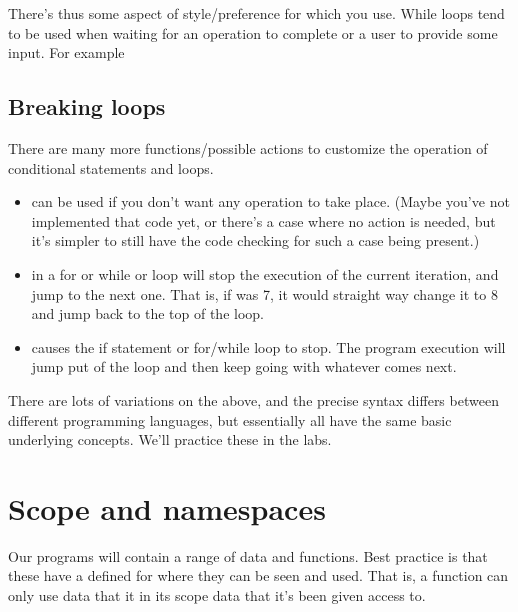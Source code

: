 \documentclass[letterpaper,10pt,british]{sphinxmanual}
\begin{document}
\sphinxAtStartPar
There’s thus some aspect of style/preference for which you use. While loops tend to be used when waiting for an operation to complete or a user to provide some input. For example

\begin{sphinxVerbatim}[commandchars=\\\{\}]
 
\end{sphinxVerbatim}


\subsection{Breaking loops}
\label{\detokenize{chapters/programming_fundamentals/conditionals_and_loops:breaking-loops}}
\sphinxAtStartPar
There are many more functions/possible actions to customize the operation of conditional statements and loops.
\begin{itemize}
\item {} 
\sphinxAtStartPar
{} can be used if you don’t want any operation to take place. (Maybe you’ve not implemented that code yet, or there’s a case where no action is needed, but it’s simpler to still have the code checking for such a case being present.)

\item {} 
\sphinxAtStartPar
{} in a for or while or loop will stop the execution of the current iteration, and jump to the next one. That is, if  was 7, it would straight way change it to 8 and jump back to the top of the loop.

\item {} 
\sphinxAtStartPar
{} causes the if statement or for/while loop to stop. The program execution will jump put of the loop and then keep going with whatever comes next.

\end{itemize}

\sphinxAtStartPar
There are lots of variations on the above, and the precise syntax differs between different programming languages, but essentially all have the same basic underlying concepts. We’ll practice these in the labs.

\sphinxstepscope


\section{Scope and namespaces}
\label{\detokenize{chapters/programming_fundamentals/scope:scope-and-namespaces}}\label{\detokenize{chapters/programming_fundamentals/scope:scope}}\label{\detokenize{chapters/programming_fundamentals/scope::doc}}
\sphinxAtStartPar
Our programs will contain a range of data and functions. Best practice is that these have a defined  for where they can be seen and used. That is, a function can only use data that it in its scope \sphinxhyphen{} data that it’s been given access to.
\end{document}
